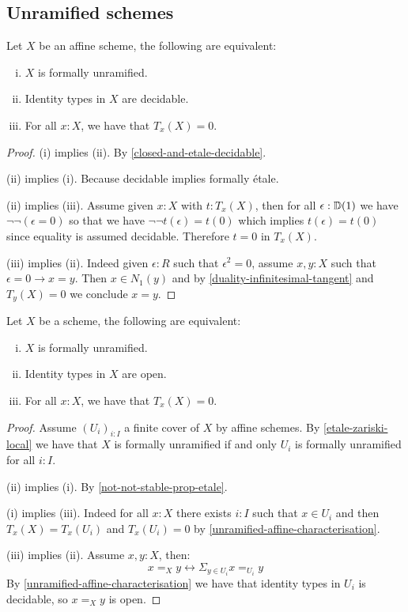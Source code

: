

\subsection{Unramified schemes}

\begin{lemma}\label{unramified-affine-characterisation}
Let $X$ be an affine scheme, the following are equivalent:
\begin{enumerate}[(i)]
\item $X$ is formally unramified.
\item Identity types in $X$ are decidable.
\item For all $x:X$, we have that $T_x(X)=0$.
\end{enumerate}
\end{lemma}

\begin{proof}
(i) implies (ii). By \cref{closed-and-etale-decidable}.

(ii) implies (i). Because decidable implies formally étale.

(ii) implies (iii). Assume given $x:X$ with $t:T_x(X)$, then for all $\epsilon:\mathbb{D}(1)$ we have $\neg\neg(\epsilon = 0)$ so that we have $\neg\neg t(\epsilon) = t(0)$ which implies $t(\epsilon) = t(0)$ since equality is assumed decidable. Therefore $t = 0$ in $T_x(X)$.

(iii) implies (ii). Indeed given $\epsilon:R$ such that $\epsilon^2=0$, assume $x,y:X$ such that $\epsilon=0 \to x=y$. Then $x\in N_1(y)$ and by \cref{duality-infinitesimal-tangent} and $T_y(X)=0$ we conclude $x=y$.
\end{proof}

\begin{corollary}\label{unramified-scheme-characterisation}
Let $X$ be a scheme, the following are equivalent:
\begin{enumerate}[(i)]
\item $X$ is formally unramified.
\item Identity types in $X$ are open.
\item For all $x:X$, we have that $T_x(X)=0$.
\end{enumerate}
\end{corollary}

\begin{proof}
Assume $(U_i)_{i:I}$ a finite cover of $X$ by affine schemes. By \cref{etale-zariski-local} we have that $X$ is formally unramified if and only $U_i$ is formally unramified for all $i:I$.

(ii) implies (i). By \cref{not-not-stable-prop-etale}.

(i) implies (iii). Indeed for all $x:X$ there exists $i:I$ such that $x\in U_i$ and then $T_x(X) = T_x(U_i)$ and $T_x(U_i) = 0$ by \cref{unramified-affine-characterisation}.

(iii) implies (ii). Assume $x,y:X$, then:
\[x=_Xy \leftrightarrow \Sigma_{y\in U_i} x=_{U_i} y\]
By \cref{unramified-affine-characterisation} we have that identity types in $U_i$ is decidable, so $x=_Xy$ is open.
\end{proof}

